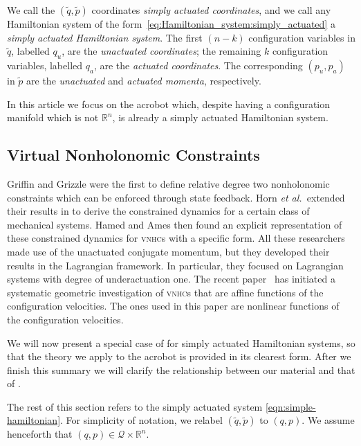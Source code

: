 \documentclass[journal,twoside,web, twocolumn]{ieeecolor}
\newcommand*{\R}{\mathbb{R}}
\renewcommand*{\Re}{\mathbb{R}}
\newcommand*{\etal}{\MakeLowercase{\textit{et al.~}}}
\newcommand*{\cQ}{\mathcal{Q}}
\newcommand*{\vnhcs}{\textsc{vnhc}s\xspace}
\begin{document}
We call the \((\tilde{q},\tilde{p})\) coordinates \textit{simply actuated coordinates}, and we call any Hamiltonian system of the form~\eqref{eq:Hamiltonian_system:simply_actuated} a  \textit{simply actuated Hamiltonian system}. The first \((n-k)\) configuration variables in \(\tilde{q}\), labelled \(q_u\), are the \textit{unactuated coordinates};  the remaining \(k\) configuration variables, labelled \(q_a\), are the \textit{actuated coordinates}. The corresponding \((p_u, p_a)\) in \(\tilde{p}\) are the \textit{unactuated} and \textit{actuated momenta}, respectively.

In this article we focus on the acrobot which, despite having a configuration
manifold which is not \(\R^n\), is already a simply actuated Hamiltonian system.

\subsection{Virtual Nonholonomic Constraints}\label{sec:vnhc-vnhc}

Griffin and Grizzle \cite{nhvc_dynamic_walking} were the first to define relative degree two nonholonomic constraints which can be enforced through state feedback. Horn \etal extended their results in \cite{hybrid_zero_dynamics_bipedal_nhvcs} to derive the constrained dynamics for a certain class of mechanical systems.  Hamed and Ames \cite{nonholonomic_hybrid_zero_dynamics} then found an explicit representation of these constrained dynamics for \vnhcs with a specific form. All these researchers made use of the unactuated conjugate momentum, but they developed their results in the Lagrangian framework. In particular, they focused on Lagrangian systems with degree of underactuation one. The recent paper~\cite{SimStraBloCol23} has initiated a systematic geometric investigation of \vnhcs that are affine functions of the configuration velocities. The ones used in this paper are nonlinear functions of the configuration velocities.

We will now present a special case of
\cite{hybrid_zero_dynamics_bipedal_nhvcs} for simply actuated Hamiltonian
systems, so that the theory we apply to the acrobot is provided in its clearest
form. After we finish this summary we will clarify the relationship between our
material and that of 
\cite{hybrid_zero_dynamics_bipedal_nhvcs,nonholonomic_hybrid_zero_dynamics}.

The rest of this section refers to the simply actuated system
\eqref{eqn:simple-hamiltonian}. For simplicity of notation, we relabel
\((\tilde{q},\tilde{p})\) to \((q,p)\). We assume henceforth that 
$(q,p) \in \cQ \times \Re^n$.
\end{document}
